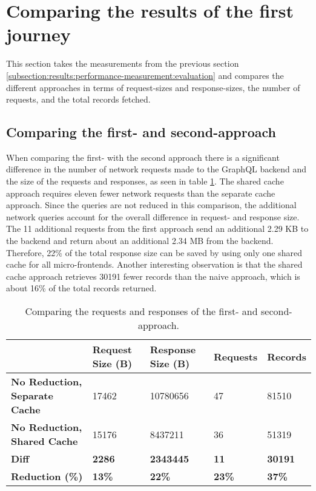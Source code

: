 \section{Comparing the results of the first journey}\label{section:results:comparison}

This section takes the measurements from the previous section \ref{subsection:results:performance-measurement:evaluation} and compares the different approaches in terms of request-sizes and response-sizes, the number of requests, and the total records fetched.

\subsection{Comparing the first- and second-approach}\label{subsection:results:comparison-first-second-approach}

When comparing the first- with the second approach there is a significant difference in the number of network requests made to the GraphQL backend and the size of the requests and responses, as seen in table \ref{table:results:size-comparison-first-path-no-cache-no-reduction-cache-no-reduction}. The shared cache approach requires eleven fewer network requests than the separate cache approach. Since the queries are not reduced in this comparison, the additional network queries account for the overall difference in request- and response size. The 11 additional requests from the first approach send an additional 2.29 KB to the backend and return about an additional 2.34 MB from the backend. Therefore, 22\% of the total response size can be saved by using only one shared cache for all micro-frontends. Another interesting observation is that the shared cache approach retrieves 30191 fewer records than the naive approach, which is about 16\% of the total records returned.

\ifshowTables
\begin{table}[H]
  \begin{tabular}{|l|l|l|l|l|}
  \hline
    & \textbf{Request Size (B)} & \textbf{Response Size (B)} & \textbf{Requests} & \textbf{Records} \\
    \hline
    \textbf{No Reduction, Separate Cache} & 17462 & 10780656 & 47 & 81510 \\
    \hline
    \textbf{No Reduction, Shared Cache} & 15176 & 8437211 & 36 & 51319 \\
    \hline
    \hline
    \textbf{Diff} & \textbf{2286} & \textbf{2343445} & \textbf{11} & \textbf{30191} \\
    \hline
    \textbf{Reduction (\%)} & \textbf{13\%} & \textbf{22\%} & \textbf{23\%} & \textbf{37\%} \\
    \hline
  \end{tabular}
  \caption{Comparing the requests and responses of the first- and second-approach.}\label{table:results:size-comparison-first-path-no-cache-no-reduction-cache-no-reduction}
\end{table}
\fi

